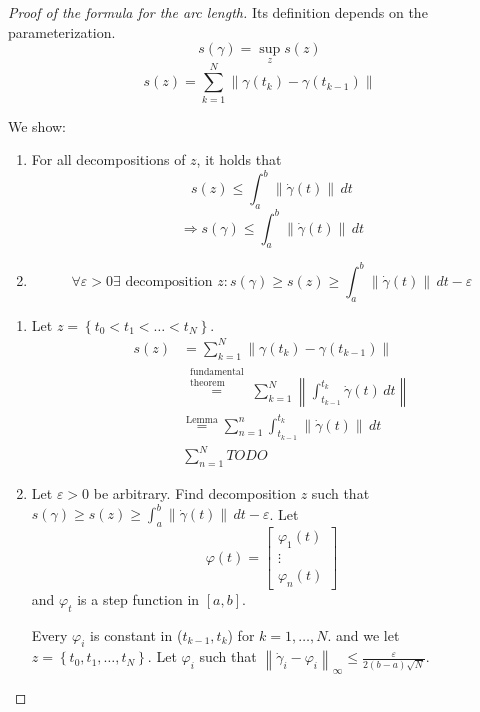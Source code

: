 \documentclass[a4paper,landscape,twocolumn]{article}
\theoremstyle{definition}
\newcommand\set[1]{\left\{#1\right\}}
\newcommand\norm[1]{\left\|#1\right\|}
\newcommand\inorm[1]{\left\|#1\right\|_\infty}
\begin{document}
\begin{proof}[Proof of the formula for the arc length]
  Its definition depends on the parameterization.
  \[ s(\gamma) = \sup_z{s(z)} \]
  \[ s(z) = \sum_{k=1}^N \norm{\gamma(t_k) - \gamma(t_{k-1})} \]

  We show:
  \begin{enumerate}
    \item
      For all decompositions of $z$, it holds that
      \[ s(z) \leq \int_a^b \norm{\dot\gamma(t)} \, dt \]
      \[ \Rightarrow s(\gamma) \leq \int_a^b \norm{\dot\gamma(t)} \, dt \]
    \item
      \[ \forall \varepsilon > 0 \exists \text{ decomposition } z: s(\gamma) \geq s(z) \geq \int_a^b \norm{\dot\gamma(t)} \, dt - \varepsilon \]
  \end{enumerate}

  \begin{enumerate}
    \item Let $z = \set{t_0 < t_1 < \ldots < t_N}$.
      \begin{align*}
        s(z) &= \sum_{k=1}^N \norm{\gamma(t_k) - \gamma(t_{k-1})}  \\
          &\overset{\substack{\text{fundamental} \\ \text{theorem}}}{=}
            \sum_{k=1}^N \norm{\int_{t_{k-1}}^{t_k} \dot\gamma(t) \, dt} \\
          &\overset{\text{Lemma}}{=}
            \sum_{n=1}^n \int_{t_{k-1}}^{t_k} \norm{\dot\gamma(t)} \, dt \\
          &\sum_{n=1}^N TODO
      \end{align*}
    \item Let $\varepsilon > 0$ be arbitrary.
      Find decomposition $z$ such that $s(\gamma) \geq s(z) \geq \int_a^b \norm{\dot\gamma(t)} \, dt - \varepsilon$.
      Let
      \[ \varphi(t) = \begin{bmatrix} \varphi_1(t) \\ \vdots \\ \varphi_n(t) \end{bmatrix} \]
      and $\varphi_t$ is a step function in $[a,b]$.

      Every $\varphi_i$ is constant in ($t_{k-1}, t_k$) for $k=1,\ldots,N$.
      and we let $z = \set{t_0, t_1, \ldots, t_N}$.
      Let $\varphi_i$ such that $\inorm{\dot\gamma_i - \varphi_i} \leq \frac{\varepsilon}{2(b - a) \sqrt{N}}$.


\end{enumerate}
\end{proof}
\end{document}
